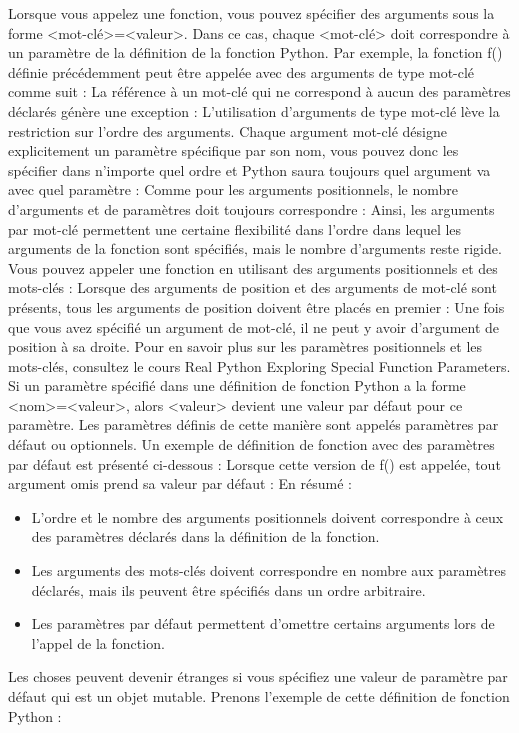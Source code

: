 Lorsque vous appelez une fonction, vous pouvez spécifier des arguments sous la forme <mot-clé>=<valeur>.  Dans ce cas, chaque <mot-clé> doit correspondre à un paramètre de la définition de la fonction Python. Par exemple, la fonction f() définie précédemment peut être appelée avec des arguments de type mot-clé comme suit :
La référence à un mot-clé qui ne correspond à aucun des paramètres déclarés génère une exception :
L'utilisation d'arguments de type mot-clé lève la restriction sur l'ordre des arguments.  Chaque argument mot-clé désigne explicitement un paramètre spécifique par son nom, vous pouvez donc les spécifier dans n'importe quel ordre et Python saura toujours quel argument va avec quel paramètre :
Comme pour les arguments positionnels, le nombre d'arguments et de paramètres doit toujours correspondre :
Ainsi, les arguments par mot-clé permettent une certaine flexibilité dans l'ordre dans lequel les arguments de la fonction sont spécifiés, mais le nombre d'arguments reste rigide.
Vous pouvez appeler une fonction en utilisant des arguments positionnels et des mots-clés :
Lorsque des arguments de position et des arguments de mot-clé sont présents, tous les arguments de position doivent être placés en premier :
Une fois que vous avez spécifié un argument de mot-clé, il ne peut y avoir d'argument de position à sa droite.
Pour en savoir plus sur les paramètres positionnels et les mots-clés, consultez le cours Real Python Exploring Special Function Parameters.
Si un paramètre spécifié dans une définition de fonction Python a la forme <nom>=<valeur>, alors <valeur> devient une valeur par défaut pour ce paramètre. Les paramètres définis de cette manière sont appelés paramètres par défaut ou optionnels. Un exemple de définition de fonction avec des paramètres par défaut est présenté ci-dessous :
Lorsque cette version de f() est appelée, tout argument omis prend sa valeur par défaut :
En résumé :
\begin{itemize}
\item L'ordre et le nombre des arguments positionnels doivent correspondre à ceux des paramètres déclarés dans la définition de la fonction.
\item Les arguments des mots-clés doivent correspondre en nombre aux paramètres déclarés, mais ils peuvent être spécifiés dans un ordre arbitraire.
\item Les paramètres par défaut permettent d'omettre certains arguments lors de l'appel de la fonction.
\end{itemize}
Les choses peuvent devenir étranges si vous spécifiez une valeur de paramètre par défaut qui est un objet mutable.  Prenons l'exemple de cette définition de fonction Python :
